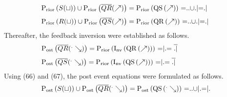 \documentclass[10pt,journal]{IEEEtran}
\begin{document}
\begin{equation}
 \begin{minipage}{250pt}
\begin{flushleft} $\displaystyle \operatorname{P_{rior}}{\left(S{\left(\sqcup \right)} \right)} \cup \operatorname{P_{rior}}{\left(\overline{QR}{\left(\nearrow \right)} \right)} = \operatorname{P_{rior}}{\left(\operatorname{QS}{\left(\nearrow \right)} \right)}$  =$..$$\cup$$.|$=$.|$\end{flushleft}
 \end{minipage}
 \end{equation}
\begin{equation}
 \begin{minipage}{250pt}
\begin{flushleft} $\displaystyle \operatorname{P_{rior}}{\left(R{\left(\sqcup \right)} \right)} \cup \operatorname{P_{rior}}{\left(\overline{QS}{\left(\nearrow \right)} \right)} = \operatorname{P_{rior}}{\left(\operatorname{QR}{\left(\nearrow \right)} \right)}$  =$..$$\cup$$.|$=$.|$\end{flushleft}
 \end{minipage}
 \end{equation}
Thereafter, the feedback inversion were established as follows.
\begin{equation}
 \begin{minipage}{250pt}
\begin{flushleft} $\displaystyle \operatorname{P_{ost}}{\left(\overline{QR}{\left(^.\searrow \right)} \right)} = \operatorname{P_{rior}}{\left(\operatorname{I_{nv}}{\left(\operatorname{QR}{\left(\nearrow \right)} \right)} \right)}$  =$|.$$=\overline{.|}$\end{flushleft}
 \end{minipage}
 \end{equation}
\begin{equation}
 \begin{minipage}{250pt}
\begin{flushleft} $\displaystyle \operatorname{P_{ost}}{\left(\overline{QS}{\left(^.\searrow \right)} \right)} = \operatorname{P_{rior}}{\left(\operatorname{I_{nv}}{\left(\operatorname{QS}{\left(\nearrow \right)} \right)} \right)}$  =$|.$$=\overline{.|}$\end{flushleft}
 \end{minipage}
 \end{equation}
Using (66) and (67), the post event equations     were formulated as follows.
\begin{equation}
 \begin{minipage}{250pt}
\begin{flushleft} $\displaystyle \operatorname{P_{ost}}{\left(S{\left(\sqcup \right)} \right)} \cup \operatorname{P_{ost}}{\left(\overline{QR}{\left(^.\searrow \right)} \right)} = \operatorname{P_{ost}}{\left(\operatorname{QS}{\left(^.\searrow \right)} \right)}$  =$..$$\cup$$|.$=$|.$\end{flushleft}
 \end{minipage}
 \end{equation}
\end{document}
